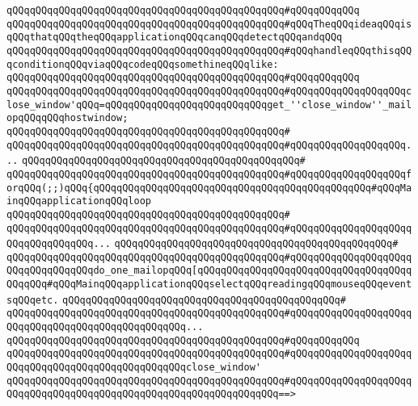 \verb|qQQqqQQqqQQqqQQqqQQqqQQqqQQqqQQqqQQqqQQqqQQqqQQq#qQQqqQQqqQQq|\newline
\verb|qQQqqQQqqQQqqQQqqQQqqQQqqQQqqQQqqQQqqQQqqQQqqQQq#qQQqTheqQQqideaqQQqisqQQqthatqQQqtheqQQqapplicationqQQqcanqQQqdetectqQQqandqQQq|\newline
\verb|qQQqqQQqqQQqqQQqqQQqqQQqqQQqqQQqqQQqqQQqqQQqqQQq#qQQqhandleqQQqthisqQQqconditionqQQqviaqQQqcodeqQQqsomethineqQQqlike:|\newline
\verb|qQQqqQQqqQQqqQQqqQQqqQQqqQQqqQQqqQQqqQQqqQQqqQQq#qQQqqQQqqQQq|\newline
\verb|qQQqqQQqqQQqqQQqqQQqqQQqqQQqqQQqqQQqqQQqqQQqqQQq#qQQqqQQqqQQqqQQqqQQqclose_window'qQQq=qQQqqQQqqQQqqQQqqQQqqQQqqQQqget_''close_window''_mailopqQQqqQQqhostwindow;|\newline
\verb|qQQqqQQqqQQqqQQqqQQqqQQqqQQqqQQqqQQqqQQqqQQqqQQq#|\newline
\verb|qQQqqQQqqQQqqQQqqQQqqQQqqQQqqQQqqQQqqQQqqQQqqQQq#qQQqqQQqqQQqqQQqqQQq...|\newline
\verb|qQQqqQQqqQQqqQQqqQQqqQQqqQQqqQQqqQQqqQQqqQQqqQQq#|\newline
\verb|qQQqqQQqqQQqqQQqqQQqqQQqqQQqqQQqqQQqqQQqqQQqqQQq#qQQqqQQqqQQqqQQqqQQqforqQQq(;;)qQQq{qQQqqQQqqQQqqQQqqQQqqQQqqQQqqQQqqQQqqQQqqQQqqQQq#qQQqMainqQQqapplicationqQQqloop|\newline
\verb|qQQqqQQqqQQqqQQqqQQqqQQqqQQqqQQqqQQqqQQqqQQqqQQq#|\newline
\verb|qQQqqQQqqQQqqQQqqQQqqQQqqQQqqQQqqQQqqQQqqQQqqQQq#qQQqqQQqqQQqqQQqqQQqqQQqqQQqqQQqqQQq...|\newline
\verb|qQQqqQQqqQQqqQQqqQQqqQQqqQQqqQQqqQQqqQQqqQQqqQQq#|\newline
\verb|qQQqqQQqqQQqqQQqqQQqqQQqqQQqqQQqqQQqqQQqqQQqqQQq#qQQqqQQqqQQqqQQqqQQqqQQqqQQqqQQqqQQqdo_one_mailopqQQq[qQQqqQQqqQQqqQQqqQQqqQQqqQQqqQQqqQQqqQQqqQQq#qQQqMainqQQqapplicationqQQqselectqQQqreadingqQQqmouseqQQqeventsqQQqetc.|\newline
\verb|qQQqqQQqqQQqqQQqqQQqqQQqqQQqqQQqqQQqqQQqqQQqqQQq#|\newline
\verb|qQQqqQQqqQQqqQQqqQQqqQQqqQQqqQQqqQQqqQQqqQQqqQQq#qQQqqQQqqQQqqQQqqQQqqQQqqQQqqQQqqQQqqQQqqQQqqQQqqQQq...|\newline
\verb|qQQqqQQqqQQqqQQqqQQqqQQqqQQqqQQqqQQqqQQqqQQqqQQq#qQQqqQQqqQQq|\newline
\verb|qQQqqQQqqQQqqQQqqQQqqQQqqQQqqQQqqQQqqQQqqQQqqQQq#qQQqqQQqqQQqqQQqqQQqqQQqqQQqqQQqqQQqqQQqqQQqqQQqqQQqclose_window'|\newline
\verb|qQQqqQQqqQQqqQQqqQQqqQQqqQQqqQQqqQQqqQQqqQQqqQQq#qQQqqQQqqQQqqQQqqQQqqQQqqQQqqQQqqQQqqQQqqQQqqQQqqQQqqQQqqQQqqQQqqQQq==>|\newline
